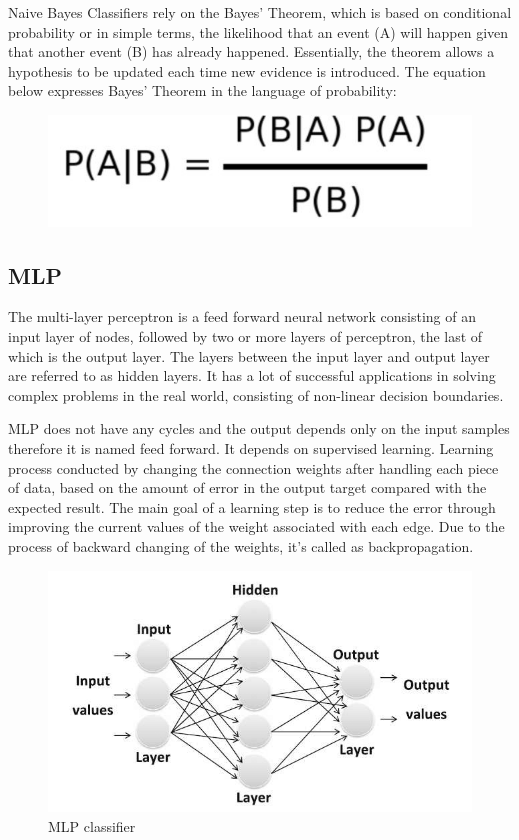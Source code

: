   Naive Bayes Classifiers rely on the Bayes’ Theorem, which is based on conditional probability or in simple terms, the likelihood that an event (A) will happen given that another event (B) has already happened. Essentially, the theorem allows a hypothesis to be updated each time new evidence is introduced. The equation below expresses Bayes’ Theorem in the language of probability:
  
    \begin{figure}[h!]
        \centering
        \includegraphics[scale=0.5]{Figures/eq2.png}
    \end{figure}

\subsection{MLP}
   
    The multi-layer perceptron is a feed forward neural network consisting of an input layer of nodes, followed by two or more layers of perceptron, the last of which is the output layer. The layers between the input layer and output layer are referred to as hidden layers. It has a lot of successful applications in solving complex problems in the real world, consisting of non-linear decision boundaries.
    
    MLP does not have any cycles and the output depends only
   on the input samples therefore it is named feed forward. It depends on supervised learning. Learning process conducted by changing the connection weights after handling each piece of data, based on the amount of error in the output target compared with the expected result. The main goal of a learning step is to reduce the error through improving the current values of the weight associated with each edge. Due to the process of backward changing of the weights, it’s called as backpropagation. 
   
   \begin{figure}[h!]
       \centering
       \includegraphics[scale=0.5]{Figures/MLP.png}
       \caption[MLP classifier]{MLP classifier}
       \label{fig:my_label}
   \end{figure}
   
